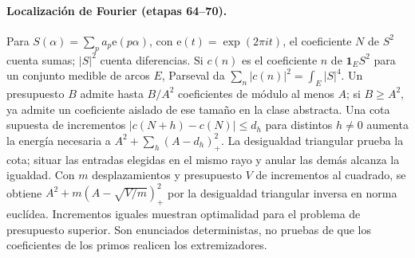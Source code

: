\documentclass[11pt,a4paper]{article}
\newcommand{\B}[2]{#2}
\newcommand{\B}[2]{#1}
\newcommand{\e}{\mathrm e}
\newcommand{\one}{\mathbf 1}
\newcommand{\pos}[1]{(#1)_+}
\begin{document}
\paragraph{\B{Fourier localization (stages 64--70).}{Localización de Fourier (etapas 64--70).}}
\B{For $S(\alpha)=\sum_p a_p\e(p\alpha)$, where $\e(t)=\exp(2\pi it)$, the $N$th coefficient of $S^2$ counts sums; $|S|^2$ counts differences. If $c(n)$ is the $n$th coefficient of $\one_E S^2$ on a measurable set of arcs $E$, Parseval gives $\sum_n|c(n)|^2=\int_E |S|^4$. A budget $B$ allows as many as $B/A^2$ coefficients of size at least $A$; if $B\ge A^2$, a singleton of exactly this size is already admissible in the abstract coefficient class. An assumed increment bound $|c(N+h)-c(N)|\le d_h$ for distinct nonzero $h$ raises the necessary energy to $A^2+\sum_h\pos{A-d_h}^2$. The triangle inequality proves the bound, and putting all of the selected entries on the same ray and setting all others to zero attains it. With $m$ shifts and a squared-increment budget $V$, the corresponding bound is $A^2+m\pos{A-\sqrt{V/m}}^2$, by the reverse triangle inequality in Euclidean norm. Equal increments show sharpness for the upper-budget problem. These are deterministic statements, not evidence that prime coefficients realize the extremizers.}{Para $S(\alpha)=\sum_p a_p\e(p\alpha)$, con $\e(t)=\exp(2\pi it)$, el coeficiente $N$ de $S^2$ cuenta sumas; $|S|^2$ cuenta diferencias. Si $c(n)$ es el coeficiente $n$ de $\one_E S^2$ para un conjunto medible de arcos $E$, Parseval da $\sum_n|c(n)|^2=\int_E|S|^4$. Un presupuesto $B$ admite hasta $B/A^2$ coeficientes de módulo al menos $A$; si $B\ge A^2$, ya admite un coeficiente aislado de ese tamaño en la clase abstracta. Una cota supuesta de incrementos $|c(N+h)-c(N)|\le d_h$ para distintos $h\ne0$ aumenta la energía necesaria a $A^2+\sum_h\pos{A-d_h}^2$. La desigualdad triangular prueba la cota; situar las entradas elegidas en el mismo rayo y anular las demás alcanza la igualdad. Con $m$ desplazamientos y presupuesto $V$ de incrementos al cuadrado, se obtiene $A^2+m\pos{A-\sqrt{V/m}}^2$ por la desigualdad triangular inversa en norma euclídea. Incrementos iguales muestran optimalidad para el problema de presupuesto superior. Son enunciados deterministas, no pruebas de que los coeficientes de los primos realicen los extremizadores.}
\end{document}
